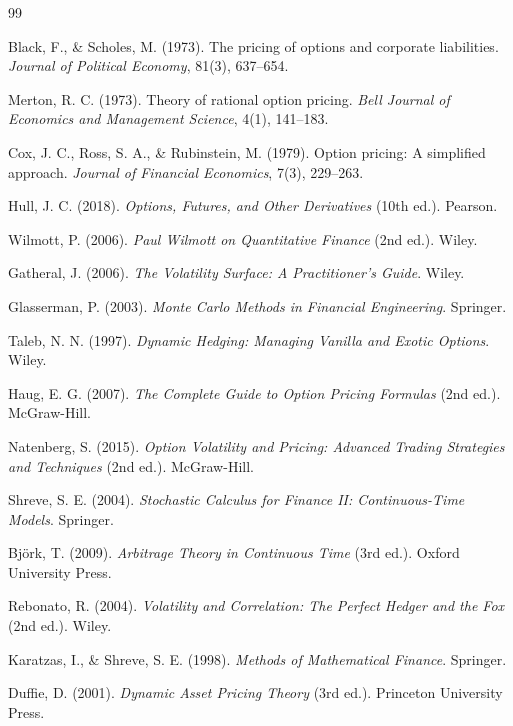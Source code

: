 \documentclass[a4paper, 11pt]{article}
\begin{document}
\begin{thebibliography}{99}

Black, F., \& Scholes, M. (1973). The pricing of options and corporate liabilities. \textit{Journal of Political Economy}, 81(3), 637--654.

Merton, R. C. (1973). Theory of rational option pricing. \textit{Bell Journal of Economics and Management Science}, 4(1), 141--183.

Cox, J. C., Ross, S. A., \& Rubinstein, M. (1979). Option pricing: A simplified approach. \textit{Journal of Financial Economics}, 7(3), 229--263.

Hull, J. C. (2018). \textit{Options, Futures, and Other Derivatives} (10th ed.). Pearson.

Wilmott, P. (2006). \textit{Paul Wilmott on Quantitative Finance} (2nd ed.). Wiley.

Gatheral, J. (2006). \textit{The Volatility Surface: A Practitioner's Guide}. Wiley.

Glasserman, P. (2003). \textit{Monte Carlo Methods in Financial Engineering}. Springer.

Taleb, N. N. (1997). \textit{Dynamic Hedging: Managing Vanilla and Exotic Options}. Wiley.

Haug, E. G. (2007). \textit{The Complete Guide to Option Pricing Formulas} (2nd ed.). McGraw-Hill.

Natenberg, S. (2015). \textit{Option Volatility and Pricing: Advanced Trading Strategies and Techniques} (2nd ed.). McGraw-Hill.

Shreve, S. E. (2004). \textit{Stochastic Calculus for Finance II: Continuous-Time Models}. Springer.

Björk, T. (2009). \textit{Arbitrage Theory in Continuous Time} (3rd ed.). Oxford University Press.

Rebonato, R. (2004). \textit{Volatility and Correlation: The Perfect Hedger and the Fox} (2nd ed.). Wiley.

Karatzas, I., \& Shreve, S. E. (1998). \textit{Methods of Mathematical Finance}. Springer.

Duffie, D. (2001). \textit{Dynamic Asset Pricing Theory} (3rd ed.). Princeton University Press.

\end{thebibliography}
\end{document}
